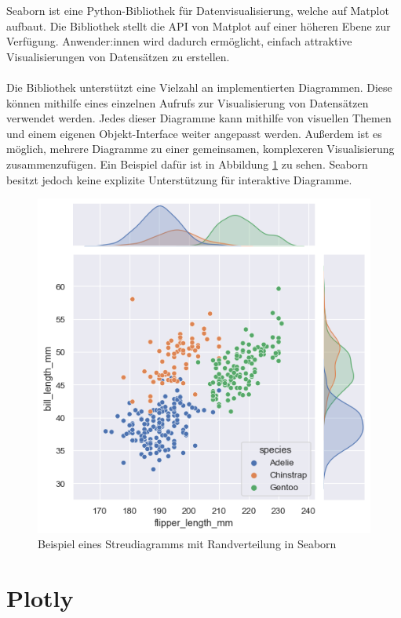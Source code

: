 Seaborn \parencite{seaborn} ist eine Python-Bibliothek für Datenvisualisierung, welche auf Matplot aufbaut. Die Bibliothek stellt die API von Matplot auf einer höheren Ebene zur Verfügung. Anwender:innen wird dadurch ermöglicht, einfach attraktive Visualisierungen von Datensätzen zu erstellen.\\\\
\noindent Die Bibliothek unterstützt eine Vielzahl an implementierten Diagrammen. Diese können mithilfe eines einzelnen Aufrufs zur Visualisierung von Datensätzen verwendet werden. Jedes dieser Diagramme kann mithilfe von visuellen Themen und einem eigenen Objekt-Interface weiter angepasst werden. Außerdem ist es möglich, mehrere Diagramme zu einer gemeinsamen, komplexeren Visualisierung zusammenzufügen. Ein Beispiel dafür ist in Abbildung \ref{fig:example_seaborn} zu sehen. Seaborn besitzt jedoch keine explizite Unterstützung für interaktive Diagramme.

\begin{figure}[H]
    \centering
    \includegraphics[height=.6\textwidth]{images/seaborn_example.png}
    \caption{Beispiel eines Streudiagramms mit Randverteilung in Seaborn\protect\footnotemark}
    \label{fig:example_seaborn}
\end{figure}




\section{Plotly}
\label{sec:plotly}


